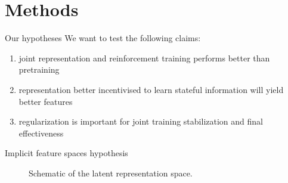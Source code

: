 \documentclass{beamer}
\begin{document}
\section{Methods}

\begin{frame}{Our hypotheses}
		We want to test the following claims:
		\begin{enumerate}
				\item joint representation and reinforcement training 
						performs better than pretraining 
				\item representation better incentivised to learn stateful information
						will yield better features
				\item regularization is important for joint training stabilization
						and final effectiveness
		\end{enumerate}
		
\end{frame}

\begin{frame}{Implicit feature spaces hypothesis}

\begin{figure}[htpb]
\begin{center}

\def\setA{(1.0,0) circle (2)}%
\def\setB{(2.7,0) circle (1.5)}%
\def\boundb{(-5,3) rectangle (9,-3)}%
\end{center}
\caption{Schematic of the latent representation space. }
\label{fig-rl-srl-features-space}
\end{figure}
\end{frame}
\end{document}
